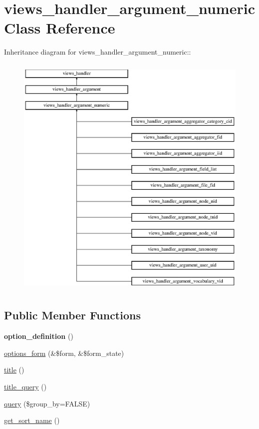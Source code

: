 \hypertarget{classviews__handler__argument__numeric}{
\section{views\_\-handler\_\-argument\_\-numeric Class Reference}
\label{classviews__handler__argument__numeric}
}
Inheritance diagram for views\_\-handler\_\-argument\_\-numeric::\begin{figure}[H]
\begin{center}
\leavevmode
\includegraphics[height=12cm]{classviews__handler__argument__numeric}
\end{center}
\end{figure}
\subsection*{Public Member Functions}
\begin{DoxyCompactItemize}
\item 
\hypertarget{classviews__handler__argument__numeric_ad2b7dc4afcf4d444e18752cfbd23ec63}{
{\bfseries option\_\-definition} ()}
\label{classviews__handler__argument__numeric_ad2b7dc4afcf4d444e18752cfbd23ec63}

\item 
\hyperlink{classviews__handler__argument__numeric_ab30359963ec4962258bb8db3b6a870c4}{options\_\-form} (\&\$form, \&\$form\_\-state)
\item 
\hyperlink{classviews__handler__argument__numeric_a480758dbcde899b5483b091e51e2bf39}{title} ()
\item 
\hyperlink{classviews__handler__argument__numeric_a5c6f566b06bad6057e92f15d82311c7b}{title\_\-query} ()
\item 
\hyperlink{classviews__handler__argument__numeric_aae525ea5d6722ebf04d1fa21f79a1a5b}{query} (\$group\_\-by=FALSE)
\item 
\hyperlink{classviews__handler__argument__numeric_a6d3833ca6193a755babc3f47b68da495}{get\_\-sort\_\-name} ()
\end{DoxyCompactItemize}

